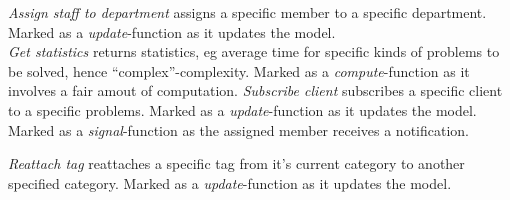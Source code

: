 \emph{Assign staff to department} assigns a specific \astaff[] member to a specific department. Marked as a \textit{update}-function as it updates the model. \\
\emph{Get statistics} returns statistics, eg average time for specific kinds of problems to be solved, hence ``complex''-complexity. Marked as a \textit{compute}-function as it involves a fair amout of computation.
\emph{Subscribe client} subscribes a specific client to a specific problems. Marked as a \textit{update}-function as it updates the model. Marked as a \textit{signal}-function as the assigned \astaff[] member receives a notification.

\emph{Reattach tag} reattaches a specific tag from it's current category to another specified category. Marked as a \textit{update}-function as it updates the model.